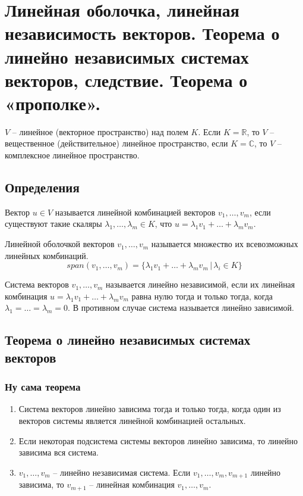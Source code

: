 \documentclass{article}
\newcommand{\R}{\mathbb R}
\begin{document}
\newpage
\section{Линейная оболочка, линейная независимость векторов. Теорема о линейно независимых системах векторов,
следствие. Теорема о «прополке».}
$V$ -- линейное (векторное пространство) над полем $K$. Если $K=\R$, то $V$ -- вещественное
(действительное) линейное пространство, если $K=\mathbb{C}$, то $V$ -- комплексное линейное
пространство.

\subsection{Определения}
Вектор $u\in V$ называется линейной комбинацией векторов $v_1,\ldots,v_m$, если существуют такие скаляры $\lambda_1,\ldots,\lambda_m\in K$, что $u=\lambda_1v_1+\ldots+\lambda_m v_m$.

Линейной оболочкой векторов $v_1,\ldots,v_m$ называется множество их всевозможных линейных комбинаций.
$$ span(v_1,\ldots,v_m)=\{\lambda_1v_1+\ldots+\lambda_m v_m\,|\,\lambda_i\in K\} $$

Система векторов $v_1,\ldots,v_m$ называется линейно независимой, если их линейная комбинация $u=\lambda_1v_1+\ldots+\lambda_m v_m$ равна нулю тогда и только тогда, когда $\lambda_1=\ldots=\lambda_m=0$. В противном случае система называется линейно зависимой.

\subsection{Теорема о линейно независимых системах векторов}
\subsubsection{Ну сама теорема}
\begin{enumerate}
    \item Система векторов линейно зависима тогда и только тогда, когда один из векторов системы является линейной комбинацией остальных.
    \item Если некоторая подсистема системы векторов линейно зависима, то линейно зависима вся система.
    \item $v_1,\ldots,v_m$ -- линейно независимая система. Если $v_1,\ldots,v_m,v_{m+1}$ линейно зависима, то $v_{m+1}$ -- линейная комбинация $v_1,\ldots,v_m$.
\end{enumerate}
\end{document}
